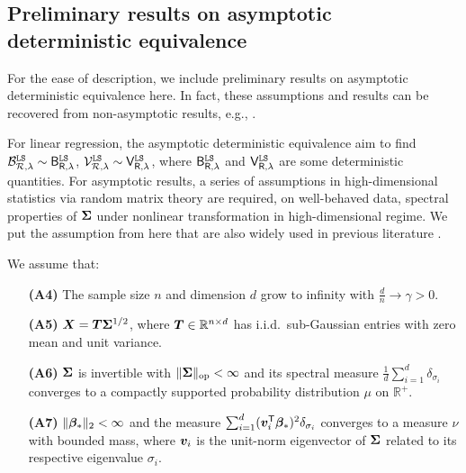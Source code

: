 \subsection{Preliminary results on asymptotic deterministic equivalence}
\label{app:pre_asy_deter_equiv}

For the ease of description, we include preliminary results on asymptotic deterministic equivalence here. In fact, these assumptions and results can be recovered from non-asymptotic results, e.g., \cite{misiakiewicz2024non}.

For linear regression, the asymptotic deterministic equivalence aim to find $\mathcal{B}_{\mathcal{R},\lambda}^{\tt LS} \sim \mathsf B_{\mathsf R, \lambda}^{\tt LS}$, $\mathcal{V}_{\mathcal{R},\lambda}^{\tt LS} \sim \mathsf V_{\mathsf R, \lambda}^{\tt LS}$, where $\mathsf B_{\mathsf R, \lambda}^{\tt LS}$ and $\mathsf V_{\mathsf R, \lambda}^{\tt LS}$ are some deterministic quantities.
For asymptotic results, a series of assumptions in high-dimensional statistics via random matrix theory are required, on well-behaved data, spectral properties of ${\boldsymbol \Sigma}$ under nonlinear transformation in high-dimensional regime.
We put the assumption from \citet{bach2024high} here that are also widely used in previous literature \cite{dobriban2018high, richards2021asymptotics}. 

\begin{assumption}\citep{bach2024high}\label{ass:asym}
    We assume that:
    \begin{itemize}
    \item[\textbf{(A4)}] The sample size $n$ and dimension $d$ grow to infinity with $\frac{d}{n} \to \gamma > 0$.
    \item[\textbf{(A5)}] ${\boldsymbol X} = {\boldsymbol T} {\boldsymbol \Sigma}^{1/2}$, where ${\boldsymbol T} \in \mathbb{R}^{n \times d}$ has i.i.d.\ sub-Gaussian entries with zero mean and unit variance.
    \item[\textbf{(A6)}] ${\boldsymbol \Sigma}$ is invertible with $\| {\boldsymbol \Sigma} \|_{\text{op}}< \infty$ and its spectral measure $ \frac{1}{d} \sum_{i=1}^d \delta_{\sigma_i} $ converges to a compactly supported probability distribution $\mu$ on $\mathbb{R}^+$.
    \item[\textbf{(A7)}] $\|{\boldsymbol \beta}_\ast\|_2 < \infty$ and the measure $ \sum_{i=1}^d ({\boldsymbol v}_i^{\mathsf T} {\boldsymbol \beta}_\ast)^2 \delta_{\sigma_i} $ converges to a measure $\nu$ with bounded mass, where ${\boldsymbol v}_i$ is the unit-norm eigenvector of ${\boldsymbol \Sigma}$ related to its respective eigenvalue $\sigma_i$.
    \end{itemize}
\end{assumption}

